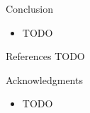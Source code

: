 \documentclass[final,hyperref={pdfpagelabels=false}]{beamer}
\begin{document}
\begin{frame}[t]
\begin{columns}[t]
\begin{column}{.465\textwidth}

\begin{block}{Conclusion}

\begin{itemize}
\item TODO
\end{itemize}

\end{block}


\begin{block}{References}
TODO
        
\nocite{*} %
\small{
}

\end{block}


\begin{block}{Acknowledgments}

\begin{itemize}
\item TODO
\end{itemize}


\end{block}
\end{column}
\end{columns}
\end{frame}
\end{document}
